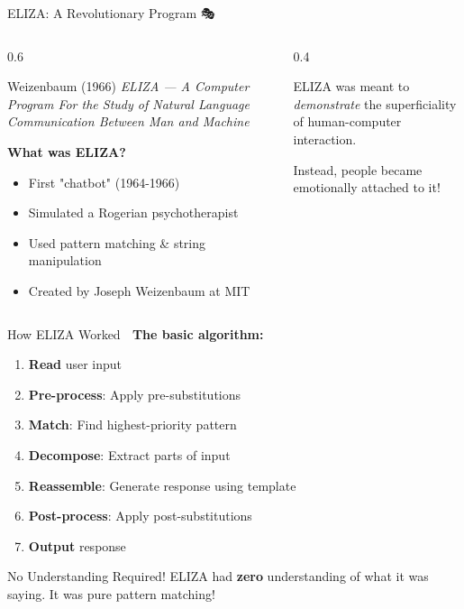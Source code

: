 \documentclass[aspectratio=169]{beamer}
\begin{document}
\begin{frame}{ELIZA: A Revolutionary Program 🎭}
\small
\begin{columns}
\begin{column}{0.6\textwidth}
\begin{block}{Weizenbaum (1966)}
\textit{ELIZA — A Computer Program For the Study of Natural Language Communication Between Man and Machine}
\end{block}

\vspace{0.15cm}

\textbf{What was ELIZA?}
\begin{itemize}\setlength{\itemsep}{0pt}
    \item First "chatbot" (1964-1966)
    \item Simulated a Rogerian psychotherapist
    \item Used pattern matching \& string manipulation
    \item Created by Joseph Weizenbaum at MIT
\end{itemize}
\end{column}

\begin{column}{0.4\textwidth}
\begin{thinkaboutit}
ELIZA was meant to \textit{demonstrate} the superficiality of human-computer interaction.

Instead, people became emotionally attached to it!
\end{thinkaboutit}
\end{column}
\end{columns}
\end{frame}

\begin{frame}[shrink=10]{How ELIZA Worked 🔧}
\textbf{The basic algorithm:}

\begin{enumerate}\setlength{\itemsep}{0pt}
    \item \textbf{Read} user input
    \item \textbf{Pre-process}: Apply pre-substitutions
    \item \textbf{Match}: Find highest-priority pattern
    \item \textbf{Decompose}: Extract parts of input
    \item \textbf{Reassemble}: Generate response using template
    \item \textbf{Post-process}: Apply post-substitutions
    \item \textbf{Output} response
\end{enumerate}

\vspace{0.3cm}

\begin{alertblock}{No Understanding Required!}
ELIZA had \textbf{zero} understanding of what it was saying. It was pure pattern matching!
\end{alertblock}
\end{frame}
\end{document}
